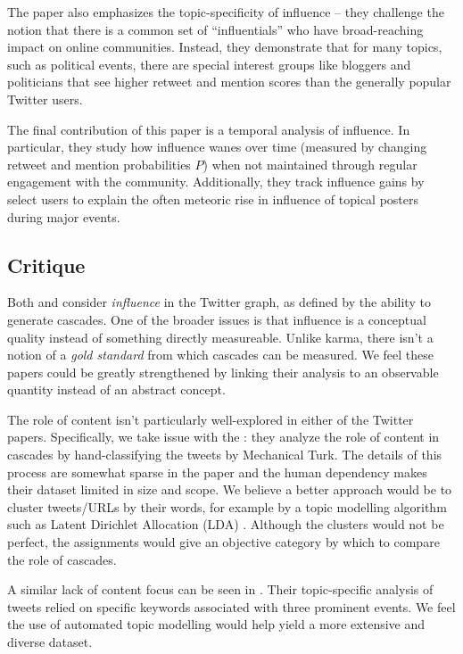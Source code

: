 \documentclass[10pt]{article}
\begin{document}
The paper also emphasizes the topic-specificity of influence -- they challenge
the notion that there is a common set of ``influentials'' who have
broad-reaching impact on online communities. Instead, they demonstrate that for
many topics, such as political events, there are special interest groups like
bloggers and politicians that see higher retweet and mention scores than the
generally popular Twitter users.

The final contribution of this paper is a temporal analysis of influence. In
particular, they study how influence wanes over time (measured by changing retweet
and mention probabilities $P$) when not maintained through regular engagement
with the community. Additionally, they track influence gains by select users
to explain the often meteoric rise in influence of topical posters during major
events.

\subsection{Critique} 
Both \citet{bakshy2011everyone} and
\citet{cha2010measuring} consider \textit{influence} in the Twitter graph, as
defined by the ability to generate cascades. One of the broader issues is that
influence is a conceptual quality instead of something directly measureable.
Unlike karma, there isn't a notion of a \textit{gold standard} from which
cascades can be measured.  We feel these papers could be greatly strengthened
by linking their analysis to an observable quantity instead of an abstract
concept.

The role of content isn't particularly well-explored in either of the Twitter papers.
Specifically, we take issue with the \citet{bakshy2011everyone}: they analyze
the role of content in cascades by hand-classifying the tweets by Mechanical Turk.
The details of this process are somewhat sparse in the paper and the human
dependency makes their dataset limited in size and scope. We believe a better
approach would be to cluster tweets/URLs by their words, for example by
a topic modelling algorithm such as Latent Dirichlet Allocation (LDA)
\citep{blei2003latent}. Although the clusters would not be perfect, the assignments
would give an objective category by which to compare the role of cascades.

A similar lack of content focus can be seen in \citet{cha2010measuring}. Their
topic-specific analysis of tweets relied on specific keywords associated with
three prominent events. We feel the use of automated topic modelling would help
yield a more extensive and diverse dataset.
\end{document}
